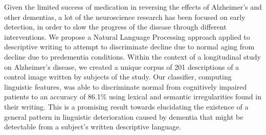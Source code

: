 Given the limited success of medication in reversing the effects of Alzheimer's and other dementias, a lot of the neuroscience research has been focused on early detection, in order to slow the progress of the disease through different interventions. We propose a Natural Language Processing approach applied to descriptive writing to attempt to discriminate decline due to normal aging from decline due to predementia conditions. Within the context of a longitudinal study on Alzheimer's disease, we created a unique corpus of 201 descriptions of a control image written by subjects of the study. Our classifier, computing linguistic features, was able to discriminate normal from cognitively impaired patients to an accuracy of 86.1\% using lexical and semantic irregularities found in their writing. This is a promising result towards elucidating the existence of a general pattern in linguistic deterioration caused by dementia that might be detectable from a subject's written descriptive language.
